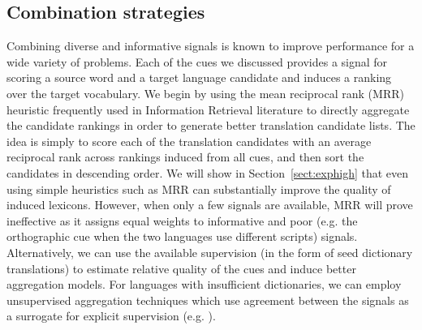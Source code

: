 \documentclass{article}
\newcommand{\secref}[1]{Section~\ref{#1}}
\newcommand{\figref}[1]{Figure~\ref{#1}}
\begin{document}

\subsection{Combination strategies}

Combining diverse and informative signals is known to improve performance \cite{Dietterich:2000} for a wide variety of problems.  Each of the cues we discussed provides a signal for scoring a source word and a target language candidate and induces a ranking over the target vocabulary.  We begin by using the mean reciprocal rank (MRR) heuristic frequently used in Information Retrieval literature to directly aggregate the candidate rankings in order to generate better translation candidate lists.  The idea is simply to score each of the translation candidates with an average reciprocal rank across rankings induced from all cues, and then sort the candidates in descending order. We will show in \secref{sect:exphigh} that even using simple heuristics such as MRR can substantially improve the quality of induced lexicons.  However, when only a few signals are available, MRR will prove ineffective as it assigns equal weights to informative and poor (e.g. the orthographic cue when the two languages use different scripts) signals.  Alternatively, we can use the available supervision (in the form of seed dictionary translations) to estimate relative quality of the cues and induce better aggregation models. For languages with insufficient dictionaries, we can employ unsupervised aggregation techniques which use agreement between the signals as a surrogate for explicit supervision (e.g. \cite{Klementiev:2006b, Klementiev:2008a}).\\


\end{document}
